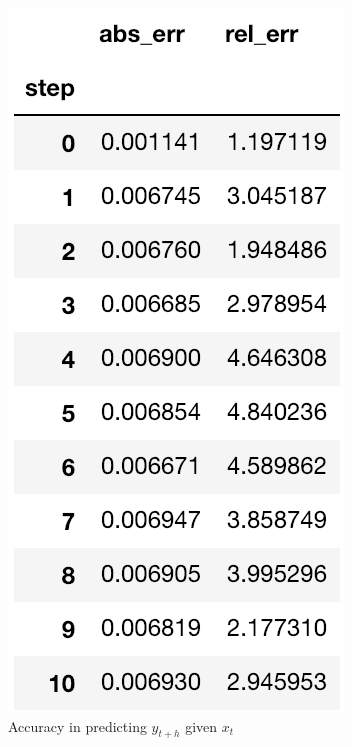 \documentclass{article}%
\begin{document}
\begin{figure}[h!]
  \centering
  \includegraphics[scale=0.6]{err_step.png}
  \caption{Accuracy in predicting $y_{t+h}$ given $x_t$ }
  \label{err_step}
\end{figure}
\end{document}
